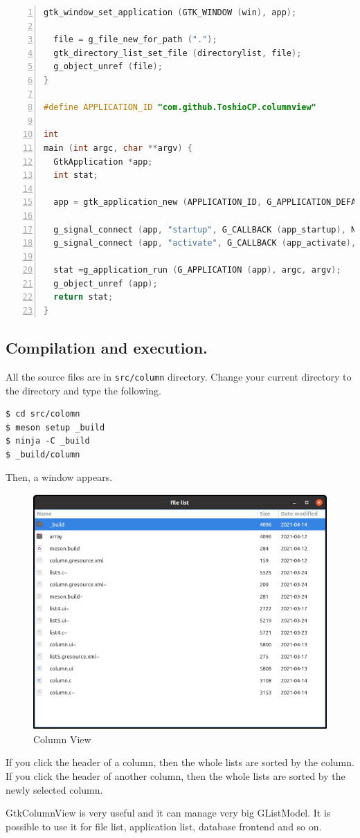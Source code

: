\begin{lstlisting}[language=C, numbers=left]
  gtk_window_set_application (GTK_WINDOW (win), app);

  file = g_file_new_for_path (".");
  gtk_directory_list_set_file (directorylist, file);
  g_object_unref (file);
}

#define APPLICATION_ID "com.github.ToshioCP.columnview"

int
main (int argc, char **argv) {
  GtkApplication *app;
  int stat;

  app = gtk_application_new (APPLICATION_ID, G_APPLICATION_DEFAULT_FLAGS);

  g_signal_connect (app, "startup", G_CALLBACK (app_startup), NULL);
  g_signal_connect (app, "activate", G_CALLBACK (app_activate), NULL);

  stat =g_application_run (G_APPLICATION (app), argc, argv);
  g_object_unref (app);
  return stat;
}
\end{lstlisting}

\subsection{Compilation and
execution.}\label{compilation-and-execution.}

All the source files are in \passthrough{\lstinline!src/column!}
directory. Change your current directory to the directory and type the
following.

\begin{lstlisting}
$ cd src/colomn
$ meson setup _build
$ ninja -C _build
$ _build/column
\end{lstlisting}

Then, a window appears.

\begin{figure}
\centering
\includegraphics[width=11.3cm,height=9cm]{../image/column_view.png}
\caption{Column View}
\end{figure}

If you click the header of a column, then the whole lists are sorted by
the column. If you click the header of another column, then the whole
lists are sorted by the newly selected column.

GtkColumnView is very useful and it can manage very big GListModel. It
is possible to use it for file list, application list, database frontend
and so on.
